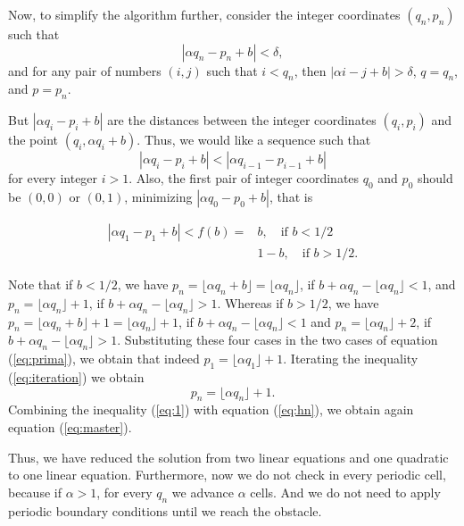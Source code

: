 \documentclass{iopart}
\newcommand{\eqref}[1]{(\ref{#1})}
\begin{document}
Now, to simplify the algorithm further, consider the integer coordinates $(q_n, p_n)$ such that
\begin{equation}
|\alpha q_n -p_n + b|< \delta,
\label{eq:1}
\end{equation}
and for any pair of numbers $(i,j)$ such that $i<q_n$, then $|\alpha i -j+ b|> \delta$,  $q=q_n$, and $p=p_n$. 
 
But $|\alpha q_i - p_i + b|$ are the distances between the integer coordinates $(q_i, p_i)$ and the point $( q_i ,\alpha q_i + b)$. Thus, we would like a sequence such that  
\begin{equation}
|\alpha q_i - p_i + b|<|\alpha q_{i-1} - p_{i-1} + b|
\label{eq:iteration}
\end{equation}
for every integer $i>1$. Also, the first pair of integer coordinates $q_0$ and $p_0$ should be $(0, 0)$ or $(0, 1)$, minimizing $| \alpha q_0 - p_0 + b |$, that is

\begin{eqnarray}
|\alpha q_1 -p_1 + b|< f(b) =& b,  \quad \mbox{if } b < 1/2 \\ 
& 1-b,  \quad \mbox{if } b > 1/2.
\label{eq:prima}
\end{eqnarray}

Note that if $b < 1/2$, we have
$p_n= \lfloor \alpha q_n +b  \rfloor= \lfloor \alpha q_n  \rfloor $, if $b+\alpha q_n-\lfloor \alpha q_n  \rfloor < 1$, and  
$p_{n} = \lfloor \alpha q_n  \rfloor+1$, if  $b+\alpha q_n-\lfloor \alpha q_n  \rfloor > 1$.
Whereas if $b>1/2$, we  have $p_n= \lfloor \alpha q_n +b  \rfloor+1= \lfloor \alpha q_n  \rfloor+1$, if $b+\alpha q_n-\lfloor \alpha q_n  \rfloor < 1$ and 
$ p_{n} = \lfloor \alpha q_n  \rfloor+2$, if $b+\alpha q_n-\lfloor \alpha q_n  \rfloor > 1$. Substituting these four cases  in the two cases of equation \eqref{eq:prima}, we obtain that indeed $p_1= \lfloor \alpha q_1  \rfloor+1$. Iterating the inequality \eqref{eq:iteration} we obtain 
\begin{equation}
 p_n= \lfloor \alpha q_n  \rfloor+1.
\label{eq:hn}
\end{equation}
Combining the inequality \eqref{eq:1} with equation \eqref{eq:hn}, we obtain again equation \eqref{eq:master}. 

Thus, we have reduced the solution from two linear equations and one quadratic to one linear equation. Furthermore, now we do not check in every periodic cell, because if $\alpha >1$, for every $q_n$ we advance $\alpha$ cells. And we do not need to apply periodic boundary conditions until we reach the obstacle. 
\end{document}
